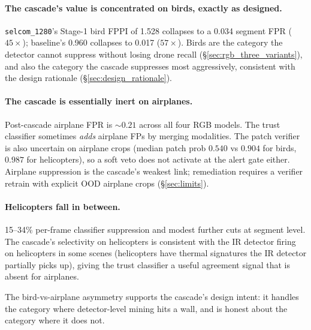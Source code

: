 \paragraph{The cascade's value is concentrated on birds, exactly as designed.}
\texttt{selcom\_1280}'s Stage-1 bird FPPI of 1.528 collapses to a 0.034 segment FPR ($45\times$); baseline's 0.960 collapses to 0.017 ($57\times$). Birds are the category the detector cannot suppress without losing drone recall (\S\ref{sec:rgb_three_variants}), and also the category the cascade suppresses most aggressively, consistent with the design rationale (\S\ref{sec:design_rationale}).

\paragraph{The cascade is essentially inert on airplanes.}
Post-cascade airplane FPR is $\sim 0.21$ across all four RGB models. The trust classifier sometimes \emph{adds} airplane FPs by merging modalities. The patch verifier is also uncertain on airplane crops (median patch prob $0.540$ vs $0.904$ for birds, $0.987$ for helicopters), so a soft veto does not activate at the alert gate either. Airplane suppression is the cascade's weakest link; remediation requires a verifier retrain with explicit OOD airplane crops (\S\ref{sec:limits}).

\paragraph{Helicopters fall in between.}
15--34\% per-frame classifier suppression and modest further cuts at segment level. The cascade's selectivity on helicopters is consistent with the IR detector firing on helicopters in some scenes (helicopters have thermal signatures the IR detector partially picks up), giving the trust classifier a useful agreement signal that is absent for airplanes.

The bird-vs-airplane asymmetry supports the cascade's design intent: it handles the category where detector-level mining hits a wall, and is honest about the category where it does not.

